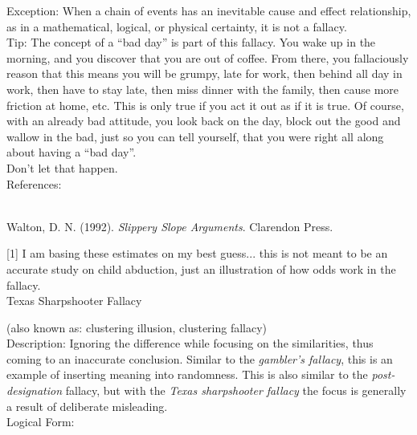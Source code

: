 \documentclass[a4paper,12pt,single,pdftex]{scrbook}
\begin{document}
    
      Exception: When a chain of events has an inevitable cause and effect relationship, as in a mathematical, logical, or physical certainty, it is not a fallacy.
    \\

    
      Tip: The concept of a “bad day” is part of this fallacy.  You wake up in the morning, and you discover that you are out of coffee.  From there, you fallaciously reason that this means you will be grumpy, late for work, then behind all day in work, then have to stay late, then miss dinner with the family, then cause more friction at home, etc.  This is only true if you act it out as if it is true.  Of course, with an already bad attitude, you look back on the day, block out the good and wallow in the bad, just so you can tell yourself, that you were right all along about having a “bad day”.
    \\

    
      Don’t let that happen.
    \\

    References:

    
      
        
      \\

      
        
          Walton, D. N. (1992). {\it Slippery Slope Arguments}. Clarendon Press.
        
      
      
        [1] I am basing these estimates on my best guess... this is not meant to be an accurate study on child abduction, just an illustration of how odds work in the fallacy.
      \\

    
  

Texas Sharpshooter Fallacy
    
      (also known as: clustering illusion, clustering fallacy)
    \\

  
    
      Description: Ignoring the difference while focusing on the similarities, thus coming to an inaccurate conclusion.  Similar to the {\it gambler’s fallacy}, this is an example of inserting meaning into randomness.  This is also similar to the {\it post-designation} fallacy, but with the {\em Texas sharpshooter fallacy} the focus is generally a result of deliberate misleading.
    \\

    
      Logical Form:
    \\
\end{document}
